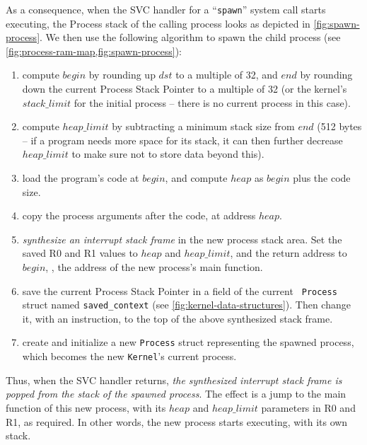 As a consequence, when the SVC handler for a ``{\tt spawn}'' system call starts
executing, the Process stack of the calling process looks as depicted in
\cref{fig:spawn-process}. We then use the following algorithm to spawn the child
process (see \cref{fig:process-ram-map,fig:spawn-process}):
\begin{enumerate}
  \item compute $\mathit{begin}$ by rounding up $\mathit{dst}$ to a multiple of
  32, and $\mathit{end}$ by rounding down the current Process Stack Pointer to
  a multiple of 32 (or the kernel's $\mathit{stack\_limit}$ for the initial
  process -- there is no current process in this case).

  \item compute $\mathit{heap\_limit}$ by subtracting a minimum stack size from
  $\mathit{end}$ (512 bytes -- if a program needs more space for its stack, it
  can then further decrease $\mathit{heap\_limit}$ to make sure not to store
  data beyond this).

  \item load the program's code at $\mathit{begin}$, and compute
  $\mathit{heap}$ as $\mathit{begin}$ plus the code size.

  \item copy the process arguments after the code, at address
  $\mathit{heap}$.

  \item {\em synthesize an interrupt stack frame} in the new process stack
  area. Set the saved R0 and R1 values to $\mathit{heap}$ and
  $\mathit{heap\_limit}$, and the return address to $\mathit{begin}$,
  \ie, the address of the new process's main function.

  \item save the current Process Stack Pointer in a field of the current {\tt
  Process} struct named {\tt saved\_context} (see
  \cref{fig:kernel-data-structures}). Then change it, with an 
  instruction, to the top of the above synthesized stack frame.

  \item create and initialize a new {\tt Process} struct representing the
  spawned process, which becomes the new {\tt Kernel}'s current process.
\end{enumerate}

Thus, when the SVC handler returns, {\em the synthesized interrupt stack frame
is popped from the stack of the spawned process}. The effect is a jump to the
main function of this new process, with its $\mathit{heap}$ and
$\mathit{heap\_limit}$ parameters in R0 and R1, as required. In other words,
the new process starts executing, with its own stack.

